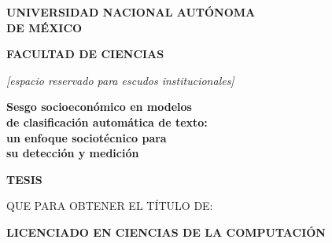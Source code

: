 
\begin{titlepage}
\thispagestyle{empty}
\begin{center}

\vspace*{0.2cm}

{\Large\bfseries UNIVERSIDAD NACIONAL AUTÓNOMA \\[0.2em] DE MÉXICO}

\vspace{0.4cm}

{\large\bfseries FACULTAD DE CIENCIAS}

\vspace{1.0cm}

\rule{0pt}{4cm}\textit{[espacio reservado para escudos institucionales]}

\vspace{1.4cm}

{\Large\bfseries
Sesgo socioeconómico en modelos \\[0.25em]
de clasificación automática de texto: \\[0.25em]
un enfoque sociotécnico para \\[0.25em]
su detección y medición
}

\vspace{1.6cm}

{\LARGE\bfseries T\hspace{0.5em}E\hspace{0.5em}S\hspace{0.5em}I\hspace{0.5em}S}

\vspace{0.8cm}

QUE PARA OBTENER EL TÍTULO DE:

\vspace{0.4cm}

{\large\bfseries LICENCIADO EN CIENCIAS DE LA COMPUTACIÓN}

\vspace{1.0cm}


\end{center}
\end{titlepage}
